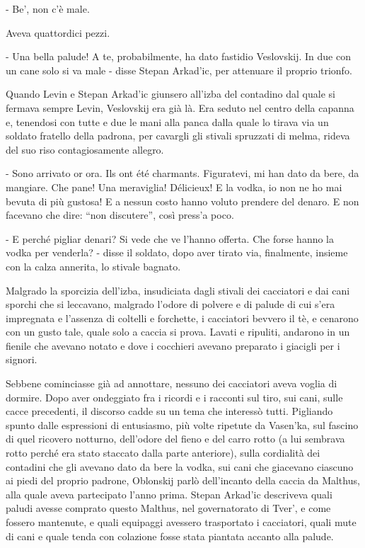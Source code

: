 - Be', non c'è male. 

Aveva quattordici pezzi. 

- Una bella palude! A te, probabilmente, ha dato fastidio Veslovskij. In due con un cane solo si va male - disse Stepan Arkad'ic, per attenuare il proprio trionfo. 

Quando Levin e Stepan Arkad'ic giunsero all'izba del contadino dal quale si fermava sempre Levin, Veslovskij era già là. Era seduto nel centro della capanna e, tenendosi con tutte e due le mani alla panca dalla quale lo tirava via un soldato fratello della padrona, per cavargli gli stivali spruzzati di melma, rideva del suo riso contagiosamente allegro. 

- Sono arrivato or ora. Ils ont été charmants. Figuratevi, mi han dato da bere, da mangiare. Che pane! Una meraviglia! Délicieux! E la vodka, io non ne ho mai bevuta di più gustosa! E a nessun costo hanno voluto prendere del denaro. E non facevano che dire: ``non discutere'', così press'a poco. 

- E perché pigliar denari? Si vede che ve l'hanno offerta. Che forse hanno la vodka per venderla? - disse il soldato, dopo aver tirato via, finalmente, insieme con la calza annerita, lo stivale bagnato. 

Malgrado la sporcizia dell'izba, insudiciata dagli stivali dei cacciatori e dai cani sporchi che si leccavano, malgrado l'odore di polvere e di palude di cui s'era impregnata e l'assenza di coltelli e forchette, i cacciatori bevvero il tè, e cenarono con un gusto tale, quale solo a caccia si prova. Lavati e ripuliti, andarono in un fienile che avevano notato e dove i cocchieri avevano preparato i giacigli per i signori. 

Sebbene cominciasse già ad annottare, nessuno dei cacciatori aveva voglia di dormire. Dopo aver ondeggiato fra i ricordi e i racconti sul tiro, sui cani, sulle cacce precedenti, il discorso cadde su un tema che interessò tutti. Pigliando spunto dalle espressioni di entusiasmo, più volte ripetute da Vasen'ka, sul fascino di quel ricovero notturno, dell'odore del fieno e del carro rotto (a lui sembrava rotto perché era stato staccato dalla parte anteriore), sulla cordialità dei contadini che gli avevano dato da bere la vodka, sui cani che giacevano ciascuno ai piedi del proprio padrone, Oblonskij parlò dell'incanto della caccia da Malthus, alla quale aveva partecipato l'anno prima. Stepan Arkad'ic descriveva quali paludi avesse comprato questo Malthus, nel governatorato di Tver', e come fossero mantenute, e quali equipaggi avessero trasportato i cacciatori, quali mute di cani e quale tenda con colazione fosse stata piantata accanto alla palude. 

